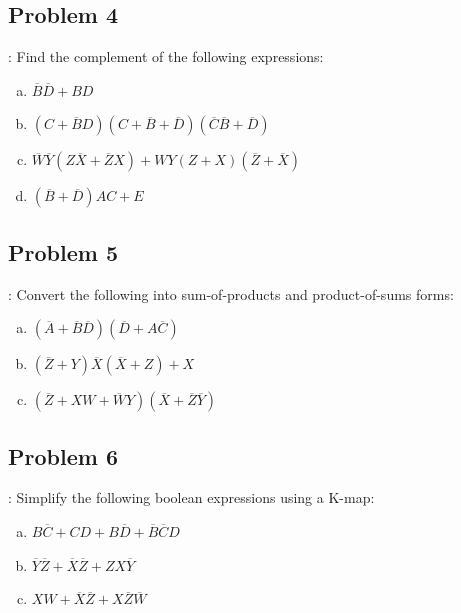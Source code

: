 \documentclass{../slides}
\begin{document}
\subsection{Problem 4}
\begin{frame}{\secname: \subsecname}
    Find the complement of the following expressions:
    \begin{enumerate}[(a)]
        \item $\overbar{B}\overbar{D} + BD$
        \item $(C + \overbar{B}D)(C + \overbar{B} + \overbar{D})(\overbar{C}\overbar{B} + \overbar{D})$
        \item $\overbar{W}\overbar{Y}(Z\overbar{X} + \overbar{Z}X) + WY(Z + X)(\overbar{Z} + \overbar{X})$
        \item $(\overbar{B} + \overbar{D})AC + E$
    \end{enumerate}
\end{frame}

\subsection{Problem 5}
\begin{frame}{\secname: \subsecname}
    Convert the following into sum-of-products and product-of-sums forms:
    \begin{enumerate}[(a)]
        \item $(\overbar{A} + \overbar{B}\overbar{D})(\overbar{D} + A\overbar{C})$
        \item $(\overbar{Z} + Y)\overbar{X}(\overbar{X} + Z) + X$
        \item $(\overbar{Z} + XW + \overbar{W}Y)(\overbar{X} + \overbar{Z}\overbar{Y})$
    \end{enumerate}
\end{frame}

\subsection{Problem 6}
\begin{frame}{\secname: \subsecname}
    Simplify the following boolean expressions using a K-map:
    \begin{enumerate}[(a)]
        \item $B\overbar{C} + CD + B\overbar{D} + \overbar{B}\overbar{C}D$
        \item $\overbar{Y}\overbar{Z} + \overbar{X}\overbar{Z} + ZX\overbar{Y}$
        \item $XW + \overbar{X}\overbar{Z} + X\overbar{Z}\overbar{W}$
    \end{enumerate}
\end{frame}
\end{document}
